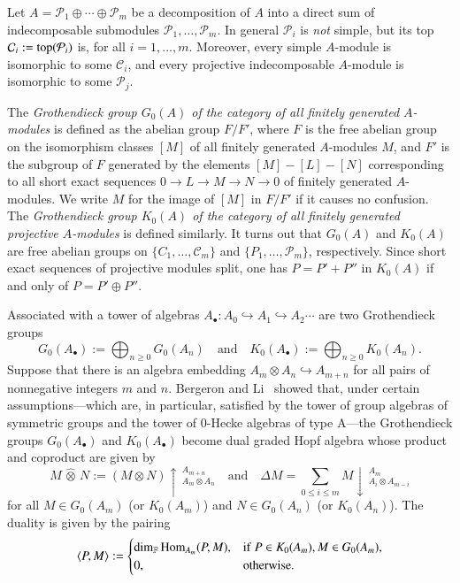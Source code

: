 \documentclass{amsart}
\newtheorem*{Young's Rule}{Young's Rule}
\theoremstyle{definition}
\theoremstyle{remark}
\numberwithin{equation}{section}
\begin{document}
Let $A={\mathcal{P}}_1\oplus\cdots\oplus {\mathcal{P}}_m$ be a decomposition of $A$ into a direct sum of indecomposable submodules ${\mathcal{P}}_1,\ldots,{\mathcal{P}}_m$. In general ${\mathcal{P}}_i$ is \emph{not} simple, but its top ${\mathcal{C}}_i:={\rm top}({\mathcal{P}}_i)$ is, for all $i=1,\ldots,m$. Moreover, every simple $A$-module is isomorphic to some ${\mathcal{C}}_i$, and every projective indecomposable $A$-module is isomorphic to some ${\mathcal{P}}_j$. 

The \emph{Grothendieck group $G_0(A)$ of the category of all finitely generated $A$-modules} is defined as the abelian group $F/F'$, where $F$ is the free abelian group on the isomorphism classes $[M]$ of all finitely generated $A$-modules $M$, and $F'$ is the subgroup of $F$ generated by the elements $[M]-[L]-[N]$ corresponding to all short exact sequences $0\to L\to M\to N\to0$ of finitely generated $A$-modules. We write $M$ for the image of $[M]$ in $F/F'$ if it causes no confusion. The \emph{Grothendieck group $K_0(A)$ of the category of all finitely generated projective $A$-modules} is defined similarly. It turns out that $G_0(A)$ and $K_0(A)$ are free abelian groups on $\{C_1,\ldots,{\mathcal{C}}_m\}$ and $\{P_1,\ldots,{\mathcal{P}}_m\}$, respectively. Since short exact sequences of projective modules split, one has $P=P'+P''$ in $K_0(A)$ if and only of $P=P'\oplus P''$. 

Associated with a tower of algebras $A_\bullet: A_0\hookrightarrow A_1\hookrightarrow A_2\cdots$ are two Grothendieck groups
\[
G_0(A_\bullet):=\bigoplus_{n\geq0} G_0(A_n) {\quad\text{and}\quad} K_0(A_\bullet):=\bigoplus_{n\geq0} K_0(A_n).
\]
Suppose that there is an algebra embedding $A_m\otimes A_n\hookrightarrow A_{m+n}$ for all pairs of nonnegative integers $m$ and $n$. Bergeron and Li~\cite{BergeronLi} showed that, under certain assumptions---which are, in particular, satisfied by the tower of group algebras of symmetric groups and the tower of 0-Hecke algebras of type A---the Grothendieck groups $G_0(A_\bullet)$ and $K_0(A_\bullet)$ become dual graded Hopf algebra whose product and coproduct are given by 
\[
M\,\widehat\otimes\, N := (M\otimes N)\uparrow\,_{A_m\otimes A_n}^{A_{m+n}} 
\quad\text{and}\quad
\Delta M = \sum_{0\le i\le m} M\downarrow\,_{A_i\otimes A_{m-i}}^{A_m}
\]
for all $M\in G_0(A_m)$ (or $K_0(A_m)$) and $N\in G_0(A_n)$ (or $K_0(A_n)$). The duality is given by the pairing
\[ \langle P,M \rangle:=
\begin{cases}
\dim_{{\mathbb F}}{\operatorname{Hom}}_{A_m} (P,M), & {\rm if}\ P\in K_0(A_m), M\in G_0(A_m),\\
0, & {\rm otherwise}.
\end{cases} \]
\end{document}
